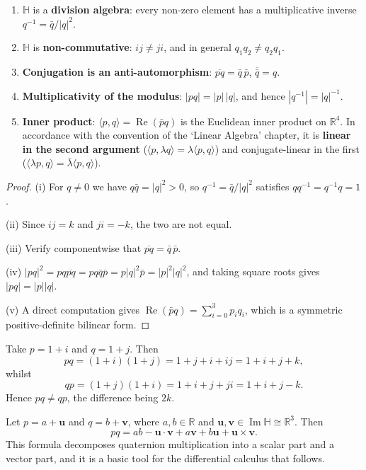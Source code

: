 \begin{property}\label{prop:q_basic_props}
\begin{enumerate}[label=(\roman*)]
    \item $\mathbb{H}$ is a \textbf{division algebra}: every non-zero element has a multiplicative inverse $q^{-1}=\bar q/|q|^2$.
    \item $\mathbb{H}$ is \textbf{non-commutative}: $ij\neq ji$, and in general $q_1q_2\neq q_2q_1$.
    \item \textbf{Conjugation is an anti-automorphism}: $\overline{pq}=\bar q\,\bar p$, $\overline{\bar q}=q$.
    \item \textbf{Multiplicativity of the modulus}: $|pq|=|p|\,|q|$, and hence $|q^{-1}|=|q|^{-1}$.
    \item \textbf{Inner product}: $\langle p,q\rangle=\operatorname{Re}(\bar p q)$ is the Euclidean inner product on $\mathbb{R}^4$. In accordance with the convention of the `Linear Algebra' chapter, it is \textbf{linear in the second argument} ($\langle p,\lambda q\rangle=\lambda\langle p,q\rangle$) and conjugate-linear in the first ($\langle \lambda p,q\rangle=\bar\lambda\langle p,q\rangle$).
\end{enumerate}
\end{property}

\begin{proof}
(i) For $q\neq 0$ we have $q\bar q=|q|^2>0$, so $q^{-1}=\bar q/|q|^2$ satisfies $qq^{-1}=q^{-1}q=1$.

(ii) Since $ij=k$ and $ji=-k$, the two are not equal.

(iii) Verify componentwise that $\overline{pq}=\bar q\,\bar p$.

(iv) $|pq|^2=pq\overline{pq}=pq\bar q\bar p=p|q|^2\bar p=|p|^2|q|^2$, and taking square roots gives $|pq|=|p||q|$.

(v) A direct computation gives $\operatorname{Re}(\bar p q)=\sum_{i=0}^3 p_iq_i$, which is a symmetric positive-definite bilinear form.
\end{proof}

\begin{example}\label{ex:q_multiplication}
Take $p=1+i$ and $q=1+j$. Then
\[
pq=(1+i)(1+j)=1+j+i+ij=1+i+j+k,
\]
whilst
\[
qp=(1+j)(1+i)=1+i+j+ji=1+i+j-k.
\]
Hence $pq\neq qp$, the difference being $2k$.
\end{example}

\begin{remark}\label{rem:q_product_vector_form}
Let $p=a+\mathbf{u}$ and $q=b+\mathbf{v}$, where $a,b\in\mathbb{R}$ and $\mathbf{u},\mathbf{v}\in\operatorname{Im}\mathbb{H}\cong\mathbb{R}^3$. Then
\[
pq=ab-\mathbf{u}\cdot\mathbf{v}+a\mathbf{v}+b\mathbf{u}+\mathbf{u}\times\mathbf{v}.
\]
This formula decomposes quaternion multiplication into a scalar part and a vector part, and it is a basic tool for the differential calculus that follows.
\end{remark}

